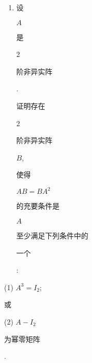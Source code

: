 \documentclass[10pt]{article}
\begin{document}
\begin{enumerate}
  \item \begin{CJK}{UTF8}{mj}设\end{CJK} $A$ \begin{CJK}{UTF8}{mj}是\end{CJK} 2 \begin{CJK}{UTF8}{mj}阶非异实阵\end{CJK}. \begin{CJK}{UTF8}{mj}证明存在\end{CJK} 2 \begin{CJK}{UTF8}{mj}阶非异实阵\end{CJK} $B$, \begin{CJK}{UTF8}{mj}使得\end{CJK} $A B=B A^{2}$ \begin{CJK}{UTF8}{mj}的充要条件是\end{CJK} $A$ \begin{CJK}{UTF8}{mj}至少满足下列条件中的\end{CJK} \begin{CJK}{UTF8}{mj}一个\end{CJK}:

\end{enumerate}
(1) $A^{3}=I_{2}$; \begin{CJK}{UTF8}{mj}或\end{CJK} (2) $A-I_{2}$ \begin{CJK}{UTF8}{mj}为幂零矩阵\end{CJK}.
\end{document}
